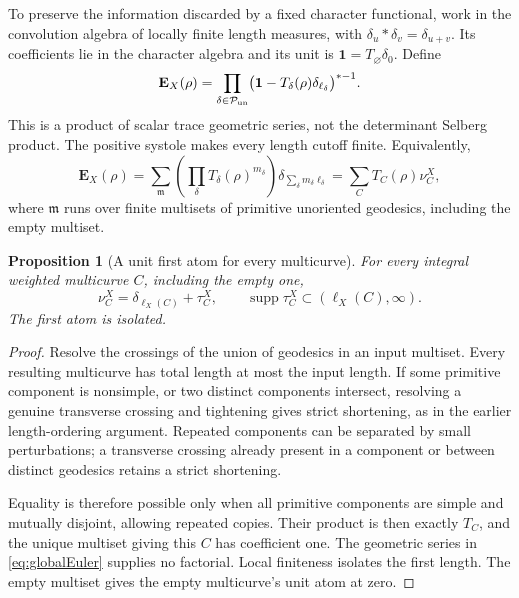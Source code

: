\documentclass[11pt,a4paper]{article}
\numberwithin{equation}{section}
\newtheorem{proposition}[theorem]{Proposition}
\theoremstyle{definition}
\theoremstyle{remark}
\begin{document}
To preserve the information discarded by a fixed character
functional, work in the convolution algebra of locally finite
length measures, with $\delta_u*\delta_v=\delta_{u+v}$.
Its coefficients lie in the character algebra and its unit is
$\mathbf1=T_\varnothing\delta_0$. Define
\begin{equation}
 \mathbf E_X(\rho)=
 \prod_{\delta\in\mathcal P_{\rm un}}
 \bigl(\mathbf1-T_\delta(\rho)\delta_{\ell_\delta}\bigr)^{*-1}.
 \label{eq:globalEuler}
\end{equation}
This is a product of scalar trace geometric series, not the
determinant Selberg product. The positive systole makes every
length cutoff finite. Equivalently,
\[
 \mathbf E_X(\rho)=
 \sum_{\mathfrak m}
   \left(\prod_\delta T_\delta(\rho)^{m_\delta}\right)
   \delta_{\sum_\delta m_\delta\ell_\delta}
 =\sum_C T_C(\rho)\nu_C^X,
\]
where $\mathfrak m$ runs over finite multisets of primitive
unoriented geodesics, including the empty multiset.

\begin{proposition}[A unit first atom for every multicurve]
\label{prop:globaldiagonal}
For every integral weighted multicurve $C$, including the empty one,
\begin{equation}
 \boxed{
 \nu_C^X=\delta_{\ell_X(C)}+\tau_C^X,\qquad
 \operatorname{supp}\tau_C^X\subset(\ell_X(C),\infty).
 }
 \label{eq:globaldiagonal}
\end{equation}
The first atom is isolated.
\end{proposition}

\begin{proof}
Resolve the crossings of the union of geodesics in an input
multiset. Every resulting multicurve has total length at most
the input length. If some primitive component is nonsimple, or
two distinct components intersect, resolving a genuine transverse
crossing and tightening gives strict shortening, as in the earlier
length-ordering argument. Repeated components can be separated by
small perturbations; a transverse crossing already present in a
component or between distinct geodesics retains a strict shortening.

Equality is therefore possible only when all primitive components
are simple and mutually disjoint, allowing repeated copies.
Their product is then exactly $T_C$, and the unique multiset giving
this $C$ has coefficient one. The geometric series in
\eqref{eq:globalEuler} supplies no factorial. Local finiteness
isolates the first length. The empty multiset gives the empty
multicurve's unit atom at zero.
\end{proof}
\end{document}
